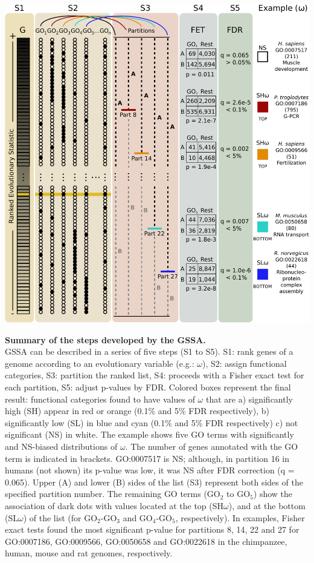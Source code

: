 \begin{FPfigure}
\centering 
\includegraphics[width=\textwidth]{figures/material_methods/gssa_met.pdf}
\caption[Summary of the steps developed by the GSSA]{
  {\bf Summary of the steps developed by the GSSA.} \\
  GSSA can be described in a series of five steps (S1 to S5). S1: rank genes of a genome according to an evolutionary variable (e.g.: $\omega$), S2: assign functional categories, S3: partition the ranked list, S4: proceeds with a Fisher exact test for each partition, S5: adjust p-values by FDR. Colored boxes represent the final result: functional categories found to have values of $\omega$ that are a) significantly high (SH) appear in red or orange (0.1\% and 5\% FDR respectively), b) significantly low (SL) in blue and cyan (0.1\% and 5\% FDR respectively) c) not significant (NS) in white. The example shows five GO terms with significantly and NS-biased distributions of $\omega$. The number of genes annotated with the GO term is indicated in brackets. GO:0007517 is NS; although, in partition 16 in humans (not shown) its p-value was low, it was NS after FDR correction (q = 0.065). Upper (A) and lower (B) sides of the list (S3) represent both sides of the specified partition number. The remaining GO terms (GO$_2$ to GO$_5$) show the association of dark dots with values located at the top (SH$\omega$), and at the bottom (SL$\omega$) of the list (for GO$_2$-GO$_3$ and GO$_4$-GO$_5$, respectively). In examples, Fisher exact tests found the most significant p-value for partitions 8, 14, 22 and 27 for GO:0007186, GO:0009566, GO:0050658 and GO:0022618 in the chimpanzee, human, mouse and rat genomes, respectively.}
\label{fig:gssa_met}
\end{FPfigure}

